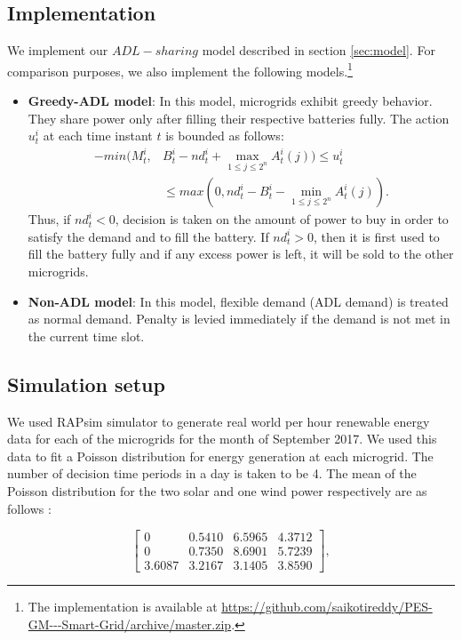 \subsection{Implementation}
We implement our $ADL-sharing$ model described in section \ref{sec:model}. For comparison purposes, we also implement the following models.\footnote{The implementation is available at \url{https://github.com/saikotireddy/PES-GM---Smart-Grid/archive/master.zip}.} 
\begin{itemize}
	\item \textbf{Greedy-ADL model}: In this model, microgrids exhibit greedy behavior. They share power only after filling their respective batteries fully. The action $u_t^i$ at each time instant $t$ is bounded as follows:  
	\begin{align}
	-min(M_t^i, & B_t^i - nd_t^i + \max_{1\leq j \leq 2^n} A_t^i(j) ) \leq u_t^i \nonumber\\ &\leq max(0, nd_t^i - B_t^i - \min_{1\leq j \leq 2^n} A_t^i(j)).
	\end{align}
	Thus, if $ nd_t^i < 0$, decision is taken on the amount of power to buy in order to satisfy the demand and to fill the battery. If $ nd_t^i > 0$, then it is first used to fill the battery fully and if any excess power is left, it will be sold to the other microgrids.
	
	\item \textbf{Non-ADL model}:  In this model, flexible demand (ADL demand) is treated as normal demand. Penalty is levied immediately if the demand is not met in the current time slot.
\end{itemize}
\subsection{Simulation setup}
We used RAPsim simulator to generate real world per hour renewable energy data for each of the microgrids  for the month of September 2017. We used this data to fit a Poisson distribution for energy generation at each microgrid. The number of decision time periods in a day is taken to be 4. The mean of the Poisson distribution for the two solar and one wind power respectively are as follows :

$$ \left[ \begin{array}{ccccc}
	0 & 0.5410 & 6.5965 & 4.3712 \\
	0 & 0.7350 & 8.6901 & 5.7239 \\
	3.6087 & 3.2167 & 3.1405 & 3.8590
\end{array} \right],$$

